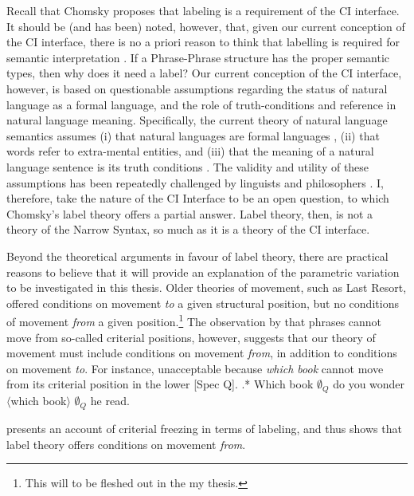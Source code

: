 \documentclass[letterpaper,12pt]{article}
\begin{document}
Recall that Chomsky proposes that labeling is a requirement of the CI interface.
It should be (and has been) noted, however, that, given our current conception of the CI interface, there is no a priori reason to think that labelling is required for semantic interpretation \parencite[see \textit{e.g.,}][]{hornstein2016arizona}.
If a Phrase-Phrase structure has the proper semantic types, then why does it need a label?
Our current conception of the CI interface, however, is based on questionable assumptions regarding the status of natural language as a formal language, and the role of truth-conditions and reference in natural language meaning.
Specifically, the current theory of natural language semantics assumes (i) that natural languages are formal languages \parencite{montague1970english}, (ii) that words refer to extra-mental entities, and (iii) that the meaning of a natural language sentence is its truth conditions \textcite{heimkratzer1998semantics}.
The validity and utility of these assumptions has been repeatedly challenged by linguists and philosophers \parencite{chomsky2000new,pietroski2005events,moravcsik1998meaning,hornstein1984logic}.
I, therefore, take the nature of the CI Interface to be an open question, to which Chomsky's label theory offers a partial answer.
Label theory, then, is not a theory of the Narrow Syntax, so much as it is a theory of the CI interface.

Beyond the theoretical arguments in favour of label theory, there are practical reasons to believe that it will provide an explanation of the parametric variation to be investigated in this thesis.
Older theories of movement, such as Last Resort, offered conditions on movement \textit{to} a given structural position, but no conditions of movement \textit{from} a given position.\footnote{This will to be fleshed out in the my thesis.}
The observation by \textcite[][and elsewhere]{rizzi2015notes} that phrases cannot move from so-called criterial positions, however, suggests that our theory of movement must include conditions on movement \textit{from}, in addition to conditions on movement \textit{to}.
For instance, \Next unacceptable because \textit{which book} cannot move from its criterial position in the lower [Spec Q].
\ex.* Which book $\emptyset_Q$ do you wonder $\langle$which book$\rangle$ $\emptyset_Q$ he read.


\textcite{chomsky2015problems} presents an account of criterial freezing in terms of labeling, and thus shows that label theory offers conditions on movement \textit{from}.
\end{document}
